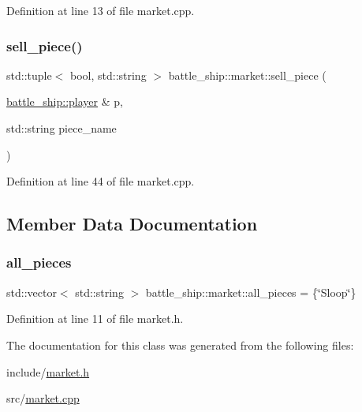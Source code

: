 Definition at line 13 of file market.\+cpp.

\mbox{\label{classbattle__ship_1_1market_ac8392668f9db1fca65c6e9072a59eb43}} 
\subsubsection{\texorpdfstring{sell\+\_\+piece()}{sell\_piece()}}
{\footnotesize\ttfamily std\+::tuple$<$ bool, std\+::string $>$ battle\+\_\+ship\+::market\+::sell\+\_\+piece (\begin{DoxyParamCaption}\item[{\hyperlink{classbattle__ship_1_1player}{battle\+\_\+ship\+::player} \&}]{p,  }\item[{std\+::string}]{piece\+\_\+name }\end{DoxyParamCaption})\hspace{0.3cm}{\ttfamily [static]}}



Definition at line 44 of file market.\+cpp.



\subsection{Member Data Documentation}
\mbox{\label{classbattle__ship_1_1market_a1bc7fb6748d38524516703c171a7041d}} 
\subsubsection{\texorpdfstring{all\+\_\+pieces}{all\_pieces}}
{\footnotesize\ttfamily std\+::vector$<$ std\+::string $>$ battle\+\_\+ship\+::market\+::all\+\_\+pieces = \{\char`\"{}Sloop\char`\"{}\}\hspace{0.3cm}{\ttfamily [static]}}



Definition at line 11 of file market.\+h.



The documentation for this class was generated from the following files\+:\begin{DoxyCompactItemize}
\item 
include/\hyperlink{market_8h}{market.\+h}\item 
src/\hyperlink{market_8cpp}{market.\+cpp}\end{DoxyCompactItemize}
